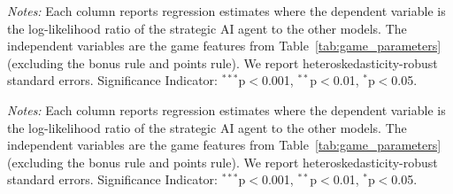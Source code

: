 \documentclass[11pt]{article}
\theoremstyle{definition}
\newcommand{\starlanguage}{Significance Indicator: $^{***}$p$<$0.001, $^{**}$p$<$0.01, $^{*}$p$<$0.05.}
\newcommand{\aisub}{AI agent}
\begin{document}
\newpage \clearpage

\begin{table}[h!] 
\begin{center}
\begin{minipage}{1 \linewidth}                          
\caption{Log-likelihood ratio regressions across game types ($\varepsilon = 0.05$)}  
\label{tab:game_level_eps_005}     
\centering                                                  
\scriptsize
\renewcommand{\arraystretch}{1.2}

\end{minipage}
\end{center}
\begin{footnotesize}
\begin{singlespace}
\vspace*{-0.15in}
\emph{Notes:} Each column reports regression estimates where the dependent variable is the log-likelihood ratio of the strategic \aisub{} to the other models.
The independent variables are the game features from Table~\ref{tab:game_parameters} (excluding the bonus rule and points rule).
We report heteroskedasticity-robust standard errors.
\starlanguage{}
\end{singlespace}
\end{footnotesize}
\end{table}

\begin{table}[h!] 
\begin{center}
\begin{minipage}{1 \linewidth}                          
\caption{Log-likelihood ratio regressions across game types ($\varepsilon = 0.1$)}  
\label{tab:game_level_eps_01}     
\centering                                                
\scriptsize
\renewcommand{\arraystretch}{1.2}

\end{minipage}
\end{center}
\begin{footnotesize}
\begin{singlespace}
\vspace*{-0.15in}
\emph{Notes:} Each column reports regression estimates where the dependent variable is the log-likelihood ratio of the strategic \aisub{} to the other models.
The independent variables are the game features from Table~\ref{tab:game_parameters} (excluding the bonus rule and points rule).
We report heteroskedasticity-robust standard errors.
\starlanguage{}
\end{singlespace}
\end{footnotesize}
\end{table}
\end{document}
